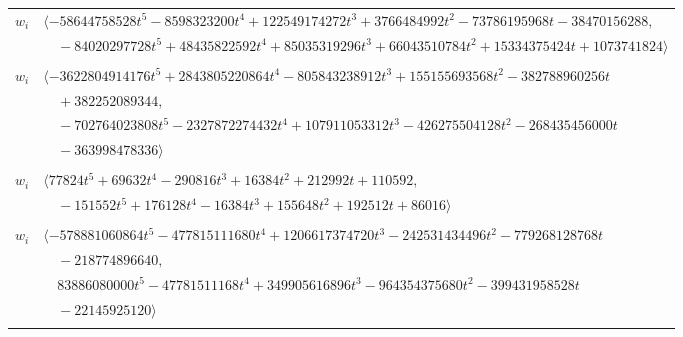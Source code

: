 \documentclass[11pt]{article}
\begin{document}
\begin{longtable}{@{}ll@{}}
$w_i$ & $\langle -58644758528t^{5}-8598323200t^{4}+122549174272t^{3}+3766484992t^{2}-73786195968t-38470156288,$\\
 & $\quad -84020297728t^{5}+48435822592t^{4}+85035319296t^{3}+66043510784t^{2}+15334375424t+1073741824\rangle$\\
\addlinespace[2pt]
\multicolumn{2}{@{}p{0.97\textwidth}@{}}{$i=9$, $D_i=268435456$, $\rho_{ij}$: $12{:}2, \allowbreak 13{:}2, \allowbreak 14{:}2, \allowbreak 24{:}2, \allowbreak 25{:}1, \allowbreak 39{:}2, \allowbreak 41{:}1, \allowbreak 43{:}2, \allowbreak 54{:}1, \allowbreak 58{:}2, \allowbreak 62{:}2, \allowbreak 71{:}2$}\\
$w_i$ & $\langle -3622804914176t^{5}+2843805220864t^{4}-805843238912t^{3}+155155693568t^{2}-382788960256t$\\
 & $\quad +382252089344,$\\
 & $\quad -702764023808t^{5}-2327872274432t^{4}+107911053312t^{3}-426275504128t^{2}-268435456000t$\\
 & $\quad -363998478336\rangle$\\
\addlinespace[2pt]
\multicolumn{2}{@{}p{0.97\textwidth}@{}}{$i=10$, $D_i=4096$, $\rho_{ij}$: $0{:}1, \allowbreak 11{:}1, \allowbreak 17{:}1, \allowbreak 22{:}1, \allowbreak 28{:}2, \allowbreak 34{:}1, \allowbreak 41{:}1, \allowbreak 43{:}1, \allowbreak 46{:}1, \allowbreak 52{:}2, \allowbreak 61{:}2$}\\
$w_i$ & $\langle 77824t^{5}+69632t^{4}-290816t^{3}+16384t^{2}+212992t+110592,$\\
 & $\quad -151552t^{5}+176128t^{4}-16384t^{3}+155648t^{2}+192512t+86016\rangle$\\
\addlinespace[2pt]
\multicolumn{2}{@{}p{0.97\textwidth}@{}}{$i=11$, $D_i=67108864$, $\rho_{ij}$: $0{:}2, \allowbreak 2{:}2, \allowbreak 7{:}1, \allowbreak 8{:}1, \allowbreak 10{:}2, \allowbreak 12{:}2, \allowbreak 18{:}2, \allowbreak 28{:}2, \allowbreak 31{:}2, \allowbreak 37{:}2, \allowbreak 41{:}1, \allowbreak 42{:}1, \allowbreak 47{:}2, \allowbreak 53{:}1, \allowbreak 69{:}1$}\\
$w_i$ & $\langle -578881060864t^{5}-477815111680t^{4}+1206617374720t^{3}-242531434496t^{2}-779268128768t$\\
 & $\quad -218774896640,$\\
 & $\quad 83886080000t^{5}-47781511168t^{4}+349905616896t^{3}-964354375680t^{2}-399431958528t$\\
 & $\quad -22145925120\rangle$\\
\addlinespace[2pt]
\multicolumn{2}{@{}p{0.97\textwidth}@{}}{$i=12$, $D_i=131072$, $\rho_{ij}$: $1{:}2, \allowbreak 6{:}1, \allowbreak 9{:}1, \allowbreak 11{:}1, \allowbreak 17{:}2, \allowbreak 28{:}1, \allowbreak 31{:}2, \allowbreak 33{:}1, \allowbreak 34{:}1, \allowbreak 44{:}1, \allowbreak 53{:}2, \allowbreak 58{:}1, \allowbreak 70{:}1$}\\

\end{longtable}
\end{document}
